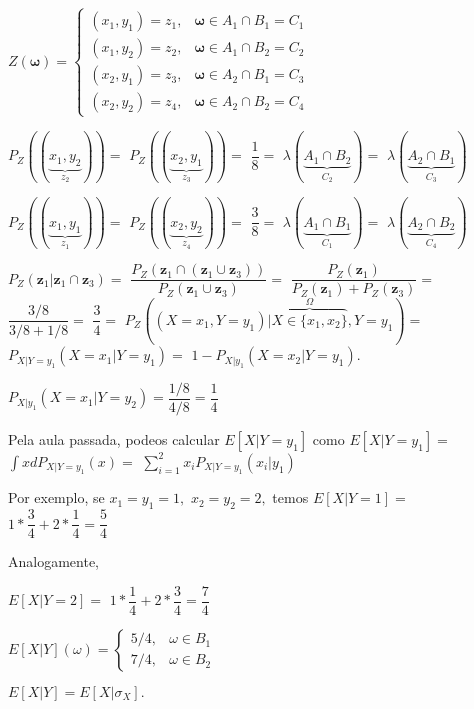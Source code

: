 \documentclass[
]{book}
\begin{document}
\(Z(\boldsymbol \omega)=\left\{\begin{array}{ll} (x_1,y_1)=z_1, & \boldsymbol \omega \in A_1 \cap B_1=C_1\\ (x_1,y_2)=z_2, & \boldsymbol \omega \in A_1 \cap B_2=C_2\\ (x_2,y_1)=z_3, & \boldsymbol \omega \in A_2 \cap B_1=C_3\\ (x_2,y_2)=z_4, & \boldsymbol \omega \in A_2 \cap B_2=C_4 \end{array}\right.\)

\(P_Z((\underbrace{x_1,y_2}_{z_2}))=\) \(P_Z((\underbrace{x_2,y_1}_{z_3}))=\) \(\dfrac{1}{8}=\) \(\lambda(\underbrace{A_1\cap B_2}_{C_2})=\) \(\lambda(\underbrace{A_2\cap B_1}_{C_3})\)

\(P_Z((\underbrace{x_1,y_1}_{z_1}))=\) \(P_Z((\underbrace{x_2,y_2}_{z_4}))=\) \(\dfrac{3}{8}=\) \(\lambda(\underbrace{A_1\cap B_1}_{C_1})=\) \(\lambda(\underbrace{A_2\cap B_2}_{C_4})\)

\(P_Z(\boldsymbol z_1| \boldsymbol z_1 \cap \boldsymbol z_3)=\) \(\dfrac{P_Z(\boldsymbol z_1 \cap (\boldsymbol z_1 \cup \boldsymbol z_3))}{P_Z(\boldsymbol z_1 \cup \boldsymbol z_3)}=\) \(\dfrac{P_Z(\boldsymbol z_1)}{P_Z(\boldsymbol z_1)+P_Z(\boldsymbol z_3)}=\) \(\dfrac{3/8}{3/8 + 1/8}=\) \(\dfrac{3}{4}=\) \(P_Z((X=x_1,Y=y_1)|\overbrace{X \in \{x_1,x_2\}}^{\Omega}, Y=y_1)=\) \(P_{X|Y=y_1}(X=x_1|Y=y_1)=\) \(1-P_{X|y_1}(X=x_2|Y=y_1).\)

\(P_{X|y_1}(X=x_1|Y=y_2)= \dfrac{1/8}{4/8}=\dfrac{1}{4}\)

Pela aula passada, podeos calcular \(E[X|Y=y_1]\) como \(E[X|Y=y_1]=\) \(\int x dP_{X|Y=y_1}(x)=\) \(\sum_{i=1}^2x_i P_{X|Y=y_1}(x_i|y_1)\)

Por exemplo, se \(x_1=y_1=1,\) \(x_2=y_2=2,\) temos \(E[X|Y=1]=\) \(1*\dfrac{3}{4}+2*\dfrac{1}{4}=\dfrac{5}{4}\)

Analogamente,

\(E[X|Y=2]=\) \(1*\dfrac{1}{4}+2*\dfrac{3}{4}=\dfrac{7}{4}\)

\(E[X|Y](\omega)=\left\{\begin{array}{ll} 5/4, & \omega \in B_1\\ 7/4, & \omega \in B_2 \end{array}\right.\)

\(E[X|Y]=E[X|\sigma_X].\)

  
\end{document}
